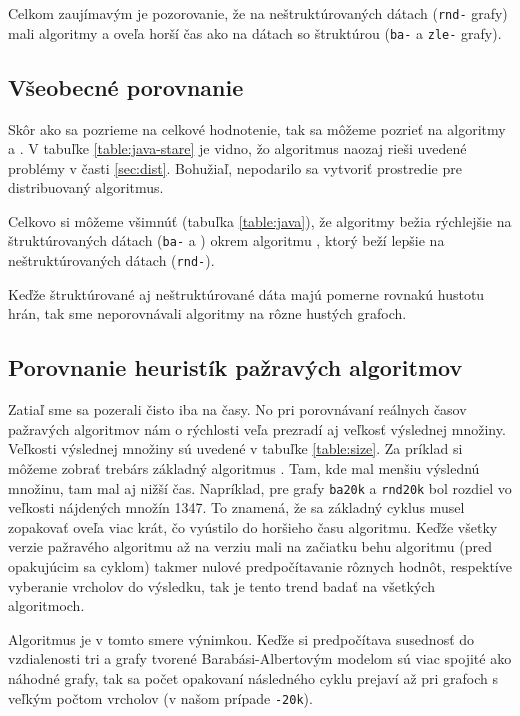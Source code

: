 Celkom zaujímavým je pozorovanie, že na neštruktúrovaných dátach (\texttt{rnd-} 
grafy) mali algoritmy  a  oveľa horší čas ako na 
dátach so štruktúrou (\texttt{ba-} a \texttt{zle-} grafy).

\subsection{Všeobecné porovnanie}

Skôr ako sa pozrieme na celkové hodnotenie, tak sa môžeme pozrieť na algoritmy 
 a . V tabuľke \ref{table:java-stare} je vidno, 
žo algoritmus  naozaj rieši uvedené problémy v časti 
\ref{sec:dist}. Bohužiaľ, nepodarilo sa vytvoriť prostredie pre distribuovaný 
algoritmus.

Celkovo si môžeme všimnúť (tabuľka \ref{table:java}), že algoritmy bežia 
rýchlejšie na štruktúrovaných dátach (\texttt{ba-} a ) okrem 
algoritmu , ktorý beží lepšie na neštruktúrovaných dátach 
(\texttt{rnd-}). 

Keďže štruktúrované aj neštruktúrované dáta majú pomerne rovnakú hustotu hrán, 
tak sme neporovnávali algoritmy na rôzne hustých grafoch.

\subsection{Porovnanie heuristík pažravých algoritmov}

Zatiaľ sme sa pozerali čisto iba na časy. No pri porovnávaní reálnych časov 
pažravých algoritmov nám o rýchlosti veľa prezradí aj veľkosť výslednej 
množiny. Veľkosti výslednej množiny sú uvedené v tabuľke \ref{table:size}. 
Za príklad si môžeme zobrať trebárs základný algoritmus . Tam, 
kde mal menšiu výslednú množinu, tam mal aj nižší čas. Napríklad, pre grafy 
\texttt{ba20k} a \texttt{rnd20k} bol rozdiel vo veľkosti nájdených množín 1347. 
To znamená, že sa základný cyklus musel zopakovať oveľa viac krát, čo vyústilo 
do horšieho času algoritmu. Keďže všetky verzie pažravého algoritmu až na 
verziu  mali na začiatku behu algoritmu (pred opakujúcim sa cyklom) 
takmer nulové predpočítavanie rôznych hodnôt, respektíve vyberanie vrcholov do 
výsledku, tak je tento trend badať na všetkých algoritmoch. 

Algoritmus  je v tomto smere výnimkou. Keďže si predpočítava 
susednosť do vzdialenosti tri a grafy tvorené Barabási-Albertovým modelom sú 
viac spojité ako náhodné grafy, tak sa počet opakovaní následného cyklu prejaví 
až pri grafoch s veľkým počtom vrcholov (v našom prípade \texttt{-20k}).

